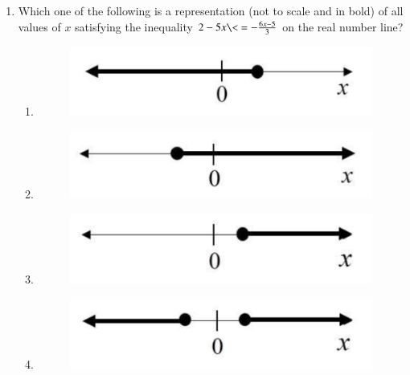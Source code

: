 \documentclass[a4paper, 11pt]{article}
\begin{document}
\begin{enumerate}
\item Which one of the following is a representation (not to scale and in bold) of all values of $x$ satisfying the inequality $2 - 5x \<= -\frac{6x - 5}{3}$ on the real number line?
\begin{enumerate}
    \item \begin{figure}[H]
        \includegraphics[width=\columnwidth]{figs/fig_2.1.png}
        \label{fig:placeholder}
    \end{figure}
    \item \begin{figure}[H]
        \includegraphics[width=\columnwidth]{figs/fig_2.2.png}
        \label{fig:placeholder}
    \end{figure}
    \item \begin{figure}[H]
        \includegraphics[width=\columnwidth]{figs/fig_2.3.png}
        \label{fig:placeholder}
    \end{figure}
    \item \begin{figure}[H]
        \includegraphics[width=\columnwidth]{figs/fig_2.4.png}
        \label{fig:placeholder}
    \end{figure}
\end{enumerate}


\end{enumerate}
\end{document}
